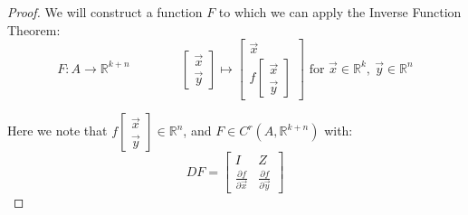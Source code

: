 \documentclass[11pt,oneside]{book}
\theoremstyle{break}
\theoremstyle{break}
\newcommand{\R}{\mathbb{R}}
\begin{document}
\begin{proof}
We will construct a function $F$ to which we can apply the Inverse Function Theorem: $$F:A \to \R^{k+n}\qquad\qquad \begin{bmatrix}
\vec{x}\\\vec{y}
\end{bmatrix} \mapsto \begin{bmatrix}
\vec{x}\\ f\begin{bmatrix}
\vec{x}\\\vec{y}
\end{bmatrix}
\end{bmatrix} \text{\ \ \  for }\vec{x}\in \R^k,\ \vec{y}\in \R^n$$ 

Here we note that $f\begin{bmatrix} \vec{x}\\\vec{y} \end{bmatrix} \in \R^n$, and $F \in C^r(A,\R^{k+n})$ with:
$$DF = \begin{bmatrix}
I & Z \\ 
\frac{\partial f}{\partial \vec{x}}& \frac{\partial f }{\partial \vec{y}}
\end{bmatrix}$$


\end{proof}
\end{document}
